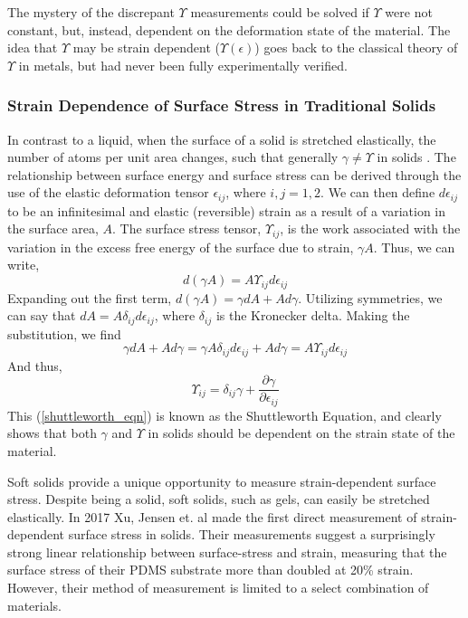 The mystery of the discrepant $ \Upsilon $ measurements could be solved if $ \Upsilon $ were not constant, but, instead, dependent on the deformation state of the material. The idea that $ \Upsilon $ may be strain dependent ($ \Upsilon(\epsilon) $) goes back to the classical theory of $ \Upsilon $ in metals, but had never been fully experimentally verified. 

\subsubsection{Strain Dependence of Surface Stress in Traditional Solids}
In contrast to a liquid, when the surface of a solid is stretched elastically, the number of atoms per unit area changes, such that generally $ \gamma \neq \Upsilon$ in solids \cite{cammarata1994surface}. The relationship between surface energy and surface stress can be derived through the use of the elastic deformation tensor $\epsilon_{ij}$, where $i,j=1,2$. We can then define $d\epsilon_{ij}$ to be an infinitesimal and elastic (reversible) strain as a result of a variation in the surface area, $A$. The surface stress tensor, $\Upsilon_{ij}$, is the work associated with the variation in the excess free energy of the surface due to strain, $\gamma A$. Thus, we can write, \[d(\gamma A) = A \Upsilon_{ij} d\epsilon_{ij}\] Expanding out the first term, $d(\gamma A) = \gamma dA + A d\gamma$. Utilizing symmetries, we can say that $dA = A \delta_{ij} d\epsilon_{ij}$, where $\delta_{ij}$ is the Kronecker delta. Making the substitution, we find \[\gamma dA + A d\gamma = \gamma A \delta_{ij} d\epsilon_{ij} + A d\gamma = A \Upsilon_{ij} d\epsilon_{ij}\] And thus,
\begin{equation}
\label{shuttleworth_eqn}
\Upsilon_{ij} = \delta_{ij}\gamma + \frac{\partial \gamma}{\partial \epsilon_{ij}} 
\end{equation}
This (\ref{shuttleworth_eqn}) is known as the Shuttleworth Equation, and clearly shows that both $\gamma$ and $\Upsilon$ in solids should be dependent on the strain state of the material.

Soft solids provide a unique opportunity to measure strain-dependent surface stress. Despite being a solid, soft solids, such as gels, can easily be stretched elastically. In 2017 Xu, Jensen et. al \cite{xu2017direct} made the first direct measurement of strain-dependent surface stress in solids. Their measurements suggest a surprisingly strong linear relationship between surface-stress and strain, measuring that the surface stress of their PDMS substrate more than doubled at 20\% strain. However, their method of measurement is limited to a select combination of materials. 

